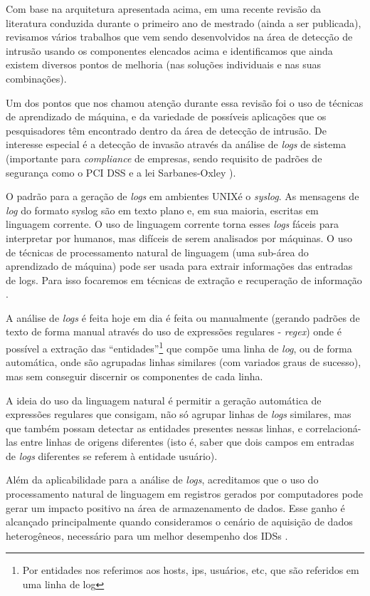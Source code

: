 \documentclass[
	12pt,				%
	openright,			%
	twoside,			%
	a4paper,			%
	english,			%
	french,				%
	spanish,			%
	brazil,				%
	]{abntex2}
\begin{document}
Com base na arquitetura apresentada acima, em uma recente revisão da literatura conduzida durante o primeiro ano de mestrado (ainda a ser publicada), revisamos vários trabalhos que vem sendo desenvolvidos na área de detecção de intrusão usando os componentes elencados acima e identificamos que ainda existem diversos pontos de melhoria (nas soluções individuais e nas suas combinações).

Um dos pontos que nos chamou atenção durante essa revisão foi o uso de técnicas de aprendizado de máquina, e da variedade de possíveis aplicações que os pesquisadores têm encontrado dentro da área de detecção de intrusão. De interesse especial é a detecção de invasão através da análise de \emph{logs} de sistema (importante para \emph{compliance} de empresas, sendo requisito de padrões de segurança como o PCI DSS e a lei Sarbanes-Oxley \cite{prakhar2012log}).

O padrão para a geração de \emph{logs} em ambientes UNIX\texttrademark é o \emph{syslog}. As mensagens de \emph{log} do formato syslog são em texto plano e, em sua maioria, escritas em linguagem corrente. O uso de linguagem corrente torna esses \emph{logs} fáceis para interpretar por humanos, mas difíceis de serem analisados por máquinas. O uso de técnicas de processamento natural de linguagem (uma sub-área do aprendizado de máquina) pode ser usada para extrair informações das entradas de logs. Para isso focaremos em técnicas de extração e recuperação de informação \cite{bird2009natural,manning2008introduction}.

A análise de \emph{logs} é feita hoje em dia é feita ou manualmente (gerando padrões de texto de forma manual através do uso de expressões regulares - \emph{regex}) onde é possível a extração das ``entidades''\footnote{Por entidades nos referimos aos hosts, ips, usuários, etc, que são referidos em uma linha de log} que compõe uma linha de \emph{log}, ou de forma automática, onde são agrupadas linhas similares (com variados graus de sucesso), mas sem conseguir discernir os componentes de cada linha.

A ideia do uso da linguagem natural é permitir a geração automática de expressões regulares que consigam, não só agrupar linhas de \emph{logs} similares, mas que também possam detectar as entidades presentes nessas linhas, e correlacioná-las entre linhas de origens diferentes (isto é, saber que dois campos em entradas de \emph{logs} diferentes se referem à entidade usuário).

Além da aplicabilidade para a análise de \emph{logs}, acreditamos que o uso do processamento natural de linguagem em registros gerados por computadores pode gerar um impacto positivo na área de armazenamento de dados. Esse ganho é alcançado principalmente quando consideramos o cenário de aquisição de dados heterogêneos, necessário para um melhor desempenho dos IDSs \cite{zuech2015intrusion}.
\end{document}
